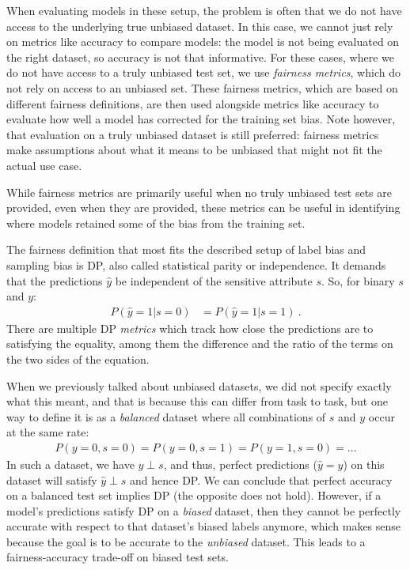 When evaluating models in these setup,
the problem is often that we do not have access to the underlying true unbiased dataset.
In this case, we cannot just rely on metrics like accuracy to compare models:
the model is not being evaluated on the right dataset, so accuracy is not that informative.
For these cases, where we do not have access to a truly unbiased test set,
we use \emph{fairness metrics}, which do not rely on access to an unbiased set.
These fairness metrics, which are based on different fairness definitions,
are then used alongside metrics like accuracy to evaluate how well a model has corrected for the training set bias.
Note however, that evaluation on a truly unbiased dataset is still preferred:
fairness metrics make assumptions about what it means to be unbiased that might not fit the actual use case.

While fairness metrics are primarily useful when no truly unbiased test sets are provided,
even when they are provided,
these metrics can be useful in identifying where models retained some of the bias from the training set.

The fairness definition that most fits the described setup of label bias and sampling bias is \acf{DP},
also called statistical parity or independence.
It demands that the predictions $\hat{y}$ be independent of the sensitive attribute \(s\).
So, for binary $s$ and $y$:
\begin{align}
  P(\hat{y}=1|s=0) &= P(\hat{y}=1|s=1)~.
  \label{eq:dp-def}
\end{align}
There are multiple \ac{DP} \emph{metrics} which track how close the predictions are to satisfying the equality,
among them the difference and the ratio of the terms on the two sides of the equation.

When we previously talked about unbiased datasets,
we did not specify exactly what this meant,
and that is because this can differ from task to task,
but one way to define it is as a \emph{balanced} dataset where all combinations of $s$ and $y$ occur at the same rate:
\begin{align}
  \label{eq:balanced-dataset}
  P(y=0,s=0)=P(y=0,s=1)=P(y=1,s=0)=\dots
\end{align}
In such a dataset, we have $y \perp s$, and thus,
perfect predictions ($\hat{y}=y$) on this dataset will satisfy $\hat{y} \perp s$ and hence \ac{DP}.
We can conclude that perfect accuracy on a balanced test set implies \acl{DP} (the opposite does not hold).
However, if a model's predictions satisfy \ac{DP} on a \emph{biased} dataset,
then they cannot be perfectly accurate with respect to that dataset's biased labels anymore,
which makes sense because the goal is to be accurate to the \emph{unbiased} dataset.
This leads to a fairness-accuracy trade-off on biased test sets.

